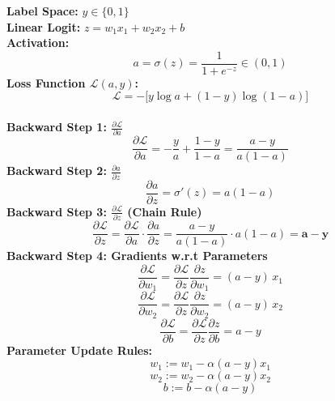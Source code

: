 \documentclass[10pt,a4paper]{article}
\begin{document}
\noindent\begin{minipage}[t]{0.485\textwidth}
\begin{tcolorbox}[
    colframe=themeblue, colback=lightbg, coltitle=white,
    fonttitle=\bfseries\sffamily\small,
    title={Path A: Sigmoid + Standard Cross-Entropy},
    arc=1.5mm, boxrule=0.6pt, left=5pt, right=5pt, top=3pt, bottom=3pt
]
\small
\textbf{Label Space:} $y \in \{0, 1\}$\\[2pt]
\textbf{Linear Logit:} $z = w_1 x_1 + w_2 x_2 + b$\\[2pt]
\textbf{Activation:}
\[
a = \sigma(z) = \frac{1}{1 + e^{-z}} \in (0, 1)
\]
\textbf{Loss Function $\mathcal{L}(a, y)$:}
\[
\mathcal{L} = -\big[ y \log a + (1 - y) \log(1 - a) \big]
\]
\hrulefill\\[2pt]
\textbf{Backward Step 1: $\frac{\partial \mathcal{L}}{\partial a}$}
\[
\frac{\partial \mathcal{L}}{\partial a} = -\frac{y}{a} + \frac{1 - y}{1 - a} = \frac{a - y}{a(1 - a)}
\]
\textbf{Backward Step 2: $\frac{\partial a}{\partial z}$}
\[
\frac{\partial a}{\partial z} = \sigma'(z) = a(1 - a)
\]
\textbf{Backward Step 3: $\frac{\partial \mathcal{L}}{\partial z}$ (Chain Rule)}
\[
\frac{\partial \mathcal{L}}{\partial z} = \frac{\partial \mathcal{L}}{\partial a} \cdot \frac{\partial a}{\partial z} = \frac{a - y}{a(1 - a)} \cdot a(1 - a) = \mathbf{a - y}
\]
\textbf{Backward Step 4: Gradients w.r.t Parameters}
\[
\frac{\partial \mathcal{L}}{\partial w_1} = \frac{\partial \mathcal{L}}{\partial z} \frac{\partial z}{\partial w_1} = (a - y) \, x_1
\]
\[
\frac{\partial \mathcal{L}}{\partial w_2} = \frac{\partial \mathcal{L}}{\partial z} \frac{\partial z}{\partial w_2} = (a - y) \, x_2
\]
\[
\frac{\partial \mathcal{L}}{\partial b} = \frac{\partial \mathcal{L}}{\partial z} \frac{\partial z}{\partial b} = a - y
\]
\textbf{Parameter Update Rules:}
\[
w_1 := w_1 - \alpha (a - y) x_1
\]
\[
w_2 := w_2 - \alpha (a - y) x_2
\]
\[
b := b - \alpha (a - y)
\]
\end{tcolorbox}
\end{minipage}
\hfill
\end{document}
